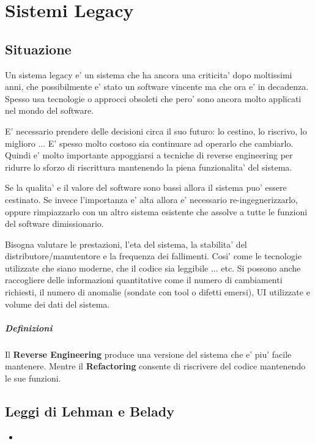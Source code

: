 \chapter{Sistemi Legacy}

\section{Situazione}

Un sistema legacy e' un sistema che ha ancora una criticita' dopo moltissimi anni, che possibilmente e' stato un software vincente ma che ora e' in decadenza.
Spesso usa tecnologie o approcci obsoleti che pero' sono ancora molto applicati nel mondo del software.

E' necessario prendere delle decisioni circa il suo futuro: lo cestino, lo riscrivo, lo miglioro ... 
E' spesso molto costoso sia continuare ad operarlo che cambiarlo.
Quindi e' molto importante appoggiarsi a tecniche di reverse engineering per ridurre lo sforzo di riscrittura mantenendo la piena funzionalita' del sistema.

Se la qualita' e il valore del software sono bassi allora il sistema puo' essere cestinato. Se invece l'importanza e' alta allora e' necessario re-ingegnerizzarlo, oppure rimpiazzarlo con un altro sistema esistente che assolve a tutte le funzioni del software dimissionario.

Bisogna valutare le prestazioni, l'eta del sistema, la stabilita' del distributore/manutentore e la frequenza dei fallimenti.
Cosi' come le tecnologie utilizzate che siano moderne, che il codice sia leggibile ... etc.
Si possono anche raccogliere delle informazioni quantitative come il numero di cambiamenti richiesti, il numero di anomalie (sondate con tool o difetti emersi), UI utilizzate e volume dei dati del sistema.

\paragraph{Definizioni}

Il \textbf{Reverse Engineering} produce una versione del sistema che e' piu' facile mantenere.
Mentre il \textbf{Refactoring} consente di riscrivere del codice mantenendo le sue funzioni.

\section{Leggi di Lehman e Belady}

\begin{itemize}
  \item
\end{itemize}
